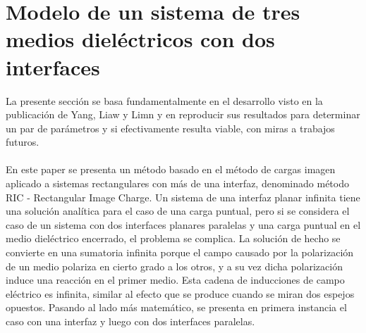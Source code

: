 \documentclass[12pt, notitlepage]{article}
\begin{document}
\section{Modelo de un sistema de tres medios dieléctricos con dos interfaces}
La presente sección se basa fundamentalmente en el desarrollo visto en la publicación de Yang, Liaw y Limn \cite{Pei-kun} y en reproducir sus resultados para determinar un par de parámetros y si efectivamente resulta viable, con miras a trabajos futuros.\\\\
En este paper se presenta un método basado en el método de cargas imagen aplicado a sistemas rectangulares con más de una interfaz, denominado método RIC - Rectangular Image Charge. Un sistema de una interfaz planar infinita tiene una solución analítica para el caso de una carga puntual, pero si se considera el caso de un sistema con dos interfaces planares paralelas y una carga puntual en el medio dieléctrico encerrado, el problema se complica. La solución de hecho se convierte en una sumatoria infinita porque el campo causado por la polarización de un medio polariza en cierto grado a los otros, y a su vez dicha polarización induce una reacción en el primer medio. Esta cadena de inducciones de campo eléctrico es infinita, similar al efecto que se produce cuando se miran dos espejos opuestos. Pasando al lado más matemático, se presenta en primera instancia el caso con una interfaz y luego con dos interfaces paralelas.
\end{document}
